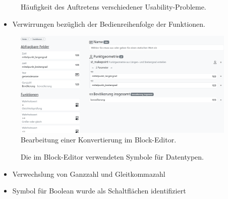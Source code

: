 \begin{frame}

  \begin{figure}
    
    \caption{Häufigkeit des Auftretens verschiedener Usability-Probleme.}
  \end{figure}

\end{frame}

\begin{frame}

  \begin{itemize}
    \item Verwirrungen bezüglich der Bedienreihenfolge der Funktionen.
  \end{itemize}

  \begin{figure}
    \begin{center}
      \includegraphics[width=0.95\textwidth]{assets/buffet-simple.png}
    \end{center}
    \caption{Bearbeitung einer Konvertierung im Block-Editor.}
  \end{figure}

\end{frame}

\begin{frame}

  \begin{figure}
    
    \caption{Die im Block-Editor verwendeten Symbole für Datentypen.}
  \end{figure}

  \begin{itemize}
    \item Verwechslung von Ganzzahl und Gleitkommazahl
    \item Symbol für Boolean wurde als Schaltflächen identifiziert
  \end{itemize}


\end{frame}

